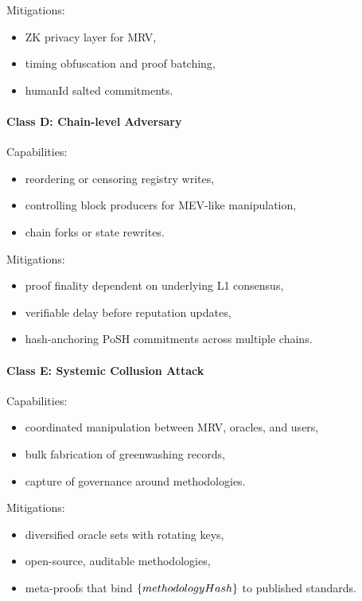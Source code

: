 \documentclass{article}
\begin{document}
Mitigations:

\begin{itemize}
\item ZK privacy layer for MRV,
\item timing obfuscation and proof batching,
\item humanId salted commitments.
\end{itemize}

\paragraph{Class D: Chain-level Adversary}

Capabilities:

\begin{itemize}
\item reordering or censoring registry writes,
\item controlling block producers for MEV-like manipulation,
\item chain forks or state rewrites.
\end{itemize}

Mitigations:

\begin{itemize}
\item proof finality dependent on underlying L1 consensus,
\item verifiable delay before reputation updates,
\item hash-anchoring PoSH commitments across multiple chains.
\end{itemize}

\paragraph{Class E: Systemic Collusion Attack}

Capabilities:

\begin{itemize}
\item coordinated manipulation between MRV, oracles, and users,
\item bulk fabrication of greenwashing records,
\item capture of governance around methodologies.
\end{itemize}

Mitigations:

\begin{itemize}
\item diversified oracle sets with rotating keys,
\item open-source, auditable methodologies,
\item meta-proofs that bind $\mathsf\{methodologyHash\}$ to published standards.
\end{itemize}
\end{document}

